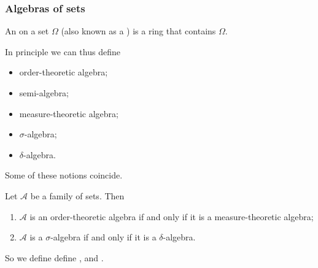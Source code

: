 \subsubsection{Algebras of sets}
\begin{definition}
An  on a set $\Omega$ (also known as a ) is a ring that contains $\Omega$.
\end{definition}

In principle we can thus define
\begin{itemize}
\item order-theoretic algebra;
\item semi-algebra;
\item measure-theoretic algebra;
\item $\sigma$-algebra;
\item $\delta$-algebra.
\end{itemize}

Some of these notions coincide.

\begin{lemma}
Let $\mathcal{A}$ be a family of sets. Then
\begin{enumerate}
\item $\mathcal{A}$ is an order-theoretic algebra \textup{if and only if} it is a measure-theoretic algebra;
\item $\mathcal{A}$ is a $\sigma$-algebra \textup{if and only if} it is a $\delta$-algebra.
\end{enumerate}
\end{lemma}

So we define define ,  and .

